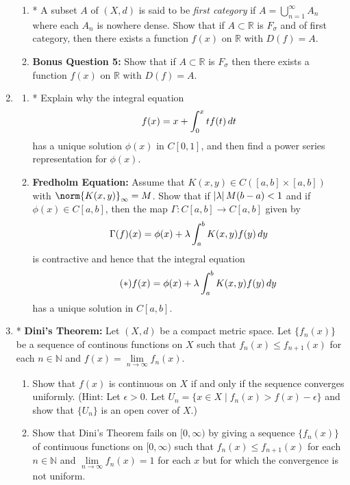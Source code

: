 \documentclass[notoc,notitlepage]{tufte-book}
\begin{document}
\begin{enumerate}
\begin{enumerate}
      \item * A subset $A$ of $(X, d)$ is said to be \textit{first category} if $A = \bigcup_{n = 1}^{\infty} A_n$ where each $A_n$ is nowhere dense. Show that if $A \subset \mathbb{R}$ is $F_\sigma$ and of first category, then there exists a function $f(x)$ on $\mathbb{R}$ with $D(f) = A$.

      \item \textbf{Bonus Question 5:} Show that if $A \subset \mathbb{R}$ is $F_\sigma$ then there exists a function $f(x)$ on $\mathbb{R}$ with $D(f) = A$.
    \end{enumerate}

  \item \begin{enumerate}
      \item * Explain why the integral equation
        \begin{equation*}
          f(x) = x + \int_{0}^{x} tf(t) \mathop{}\!d{t}
        \end{equation*}
        has a unique solution $\phi(x)$ in $C[0, 1]$, and then find a power series representation for $\phi(x)$.
      \item \textbf{Fredholm Equation:} Assume that $K(x, y) \in C( [a, b] \times [a, b] )$ with $\norm{ K(x, y) }_\infty = M$. Show that if $\left| \lambda \right| M( b - a ) < 1$ and if $\phi(x) \in C[ a, b ]$, then the map $\Gamma : C[a, b] \to C[a, b]$ given by
        \begin{equation*}
          \Gamma(f)(x) = \phi(x) + \lambda \int_{a}^{b} K(x, y) f(y) \mathop{}\!d{y}
        \end{equation*}
        is contractive and hence that the integral equation
        \begin{equation*}\tag{$*$}\label{eq:fredholm}
          f(x) = \phi(x) + \lambda \int_{a}^{b} K(x, y) f(y) \mathop{}\!d{y}
        \end{equation*}
        has a unique solution in $C[a, b]$.
    \end{enumerate}

  \item * \textbf{Dini's Theorem:} Let $(X, d)$ be a compact metric space. Let $\{ f_n(x) \}$ be a sequence of continous functions on $X$ such that $f_n(x) \leq f_{n + 1}(x)$ for each $n \in \mathbb{N}$ and $f(x) = \lim\limits_{n \to \infty} f_n(x)$.
    \begin{enumerate}
      \item Show that $f(x)$ is continuous on $X$ if and only if the sequence converges uniformly. (Hint: Let $\epsilon > 0$. Let $U_n = \{ x \in X \mid f_n(x) > f(x) - \epsilon \}$ and show that $\{ U_n \}$ is an open cover of $X$.)
      \item Show that Dini's Theorem fails on $[0 ,\infty)$ by giving a sequence $\{ f_n(x) \}$ of continuous functions on $[0, \infty)$ such that $f_n(x) \leq f_{n + 1}(x)$ for each $n \in \mathbb{N}$ and $\lim\limits_{n \to \infty} f_n(x) = 1$ for each $x$ but for which the convergence is not uniform.
    \end{enumerate}


\end{enumerate}
\end{document}
